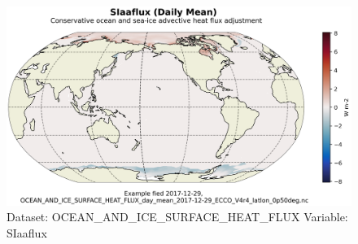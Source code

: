 \begin{figure}[H]
\centering
\includegraphics[scale=0.55]{../images/plots/latlon_plots/Ocean_and_Sea-Ice_Surface_Heat_Fluxes/SIaaflux.png}
\caption{Dataset: OCEAN\_AND\_ICE\_SURFACE\_HEAT\_FLUX Variable: SIaaflux}
\label{tab:table-OCEAN_AND_ICE_SURFACE_HEAT_FLUX_SIaaflux-Plot}
\end{figure}
\pagebreak
